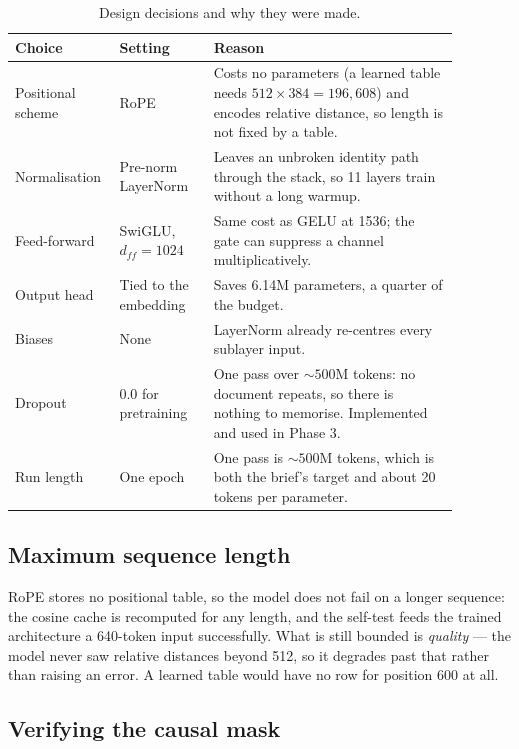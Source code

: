 \documentclass[11pt,a4paper]{article}
\begin{document}
\begin{table}[H]
\centering
\small
\begin{tabular}{p{0.16\linewidth}p{0.20\linewidth}p{0.52\linewidth}}
\toprule
\textbf{Choice} & \textbf{Setting} & \textbf{Reason} \\
\midrule
Positional scheme & RoPE & Costs no parameters (a learned table needs $512\times384=196{,}608$) and encodes relative distance, so length is not fixed by a table. \\
Normalisation & Pre-norm LayerNorm & Leaves an unbroken identity path through the stack, so 11 layers train without a long warmup. \\
Feed-forward & SwiGLU, $d_{ff}=1024$ & Same cost as GELU at 1536; the gate can suppress a channel multiplicatively. \\
Output head & Tied to the embedding & Saves 6.14M parameters, a quarter of the budget. \\
Biases & None & LayerNorm already re-centres every sublayer input. \\
Dropout & 0.0 for pretraining & One pass over ${\sim}500$M tokens: no document repeats, so there is nothing to memorise. Implemented and used in Phase 3. \\
Run length & One epoch & One pass is ${\sim}500$M tokens, which is both the brief's target and about 20 tokens per parameter. \\
\bottomrule
\end{tabular}
\caption{Design decisions and why they were made.}
\label{tab:decisions}
\end{table}


\subsection{Maximum sequence length}


RoPE stores no positional table, so the model does not fail on a longer
sequence: the cosine cache is recomputed for any length, and the self-test feeds
the trained architecture a 640-token input successfully. What is still bounded is
\emph{quality} --- the model never saw relative distances beyond 512, so it
degrades past that rather than raising an error. A learned table would have no
row for position 600 at all.


\subsection{Verifying the causal mask}
\end{document}
